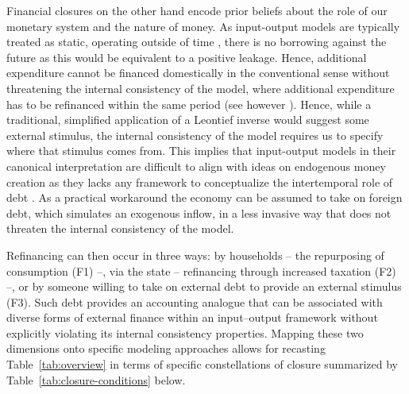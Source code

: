 Financial closures on the other hand encode prior beliefs about the role of our monetary system and the nature of money. As input-output models are typically treated as static, operating outside of time \citep[see however][]{Mercure.2018,Rocchi.2025,McGregor.1996}, there is no borrowing against the future as this would be equivalent to a positive leakage. Hence, additional expenditure cannot be financed domestically in the conventional sense without threatening the internal consistency of the model, where additional expenditure has to be refinanced within the same period (see however \citealp{Duchin.1998}). Hence, while a traditional, simplified application of a Leontief inverse would suggest some external stimulus, the internal consistency of the model requires us to specify where that stimulus comes from. This implies that input-output models in their canonical interpretation are difficult to align with ideas on endogenous money creation as they lacks any framework to conceptualize the intertemporal role of debt \citep{Lavoie.2022}. As a practical workaround the economy can be assumed to take on foreign debt, which simulates an exogenous inflow, in a less invasive way that does not threaten the internal consistency of the model.

Refinancing can then occur in three ways: by households -- the repurposing of consumption (F1) --, via the state -- refinancing through increased taxation (F2) --, or by someone willing to take on external debt to provide an external stimulus (F3). Such debt provides an accounting analogue that can be associated with diverse forms of external finance within an input--output framework without explicitly violating its internal consistency properties. Mapping these two dimensions onto specific modeling approaches allows for recasting Table~\ref{tab:overview} in terms of specific constellations of closure summarized by Table~\ref{tab:closure-conditions} below.




